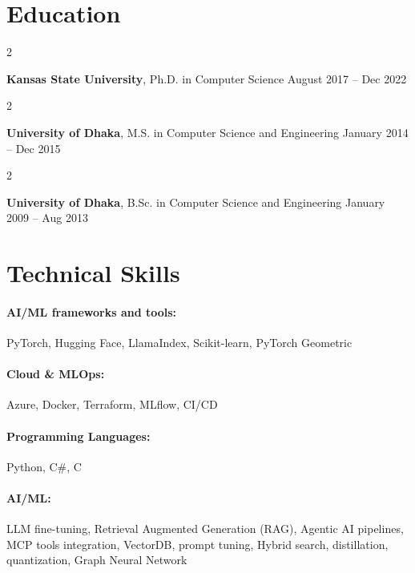 \documentclass[10pt, letterpaper]{article}
\newenvironment{twocolentry}[2][]{
    \onecolentry
    \def\secondColumn{#2}
    \setcolumnwidth{\fill, 4.5 cm}
    \begin{paracol}{2}
}{
    \switchcolumn \raggedleft \secondColumn
    \end{paracol}
    \endonecolentry
} %
\begin{document}
\section{Education}

        \begin{twocolentry}{
            August 2017 – Dec 2022
        }
            \textbf{Kansas State University}, Ph.D. in Computer Science\end{twocolentry}

        \begin{twocolentry}{
            January 2014 – Dec 2015
        }
            \textbf{University of Dhaka}, M.S. in Computer Science and Engineering\end{twocolentry}

        \begin{twocolentry}{
            January 2009 – Aug 2013
        }
            \textbf{University of Dhaka}, B.Sc. in Computer Science and Engineering\end{twocolentry}

\vspace{-1mm}
\section{Technical Skills}

        \paragraph{AI/ML frameworks and tools:} PyTorch, Hugging Face, LlamaIndex, Scikit-learn, PyTorch Geometric
        \vspace{-4mm}
        \paragraph{Cloud \& MLOps:} Azure, Docker, Terraform, MLflow, CI/CD
        \vspace{-4mm}
        \paragraph{Programming Languages:} Python, C\#, C
        \vspace{-4mm}
        \paragraph{AI/ML:} LLM fine-tuning, Retrieval Augmented Generation (RAG), Agentic AI pipelines, MCP tools integration, VectorDB, prompt tuning, Hybrid search, distillation, quantization, Graph Neural Network
\end{document}
